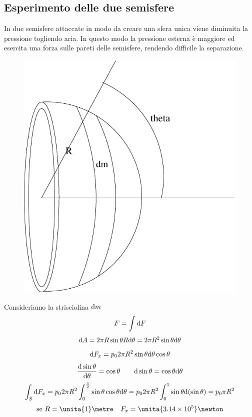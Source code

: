 \subsection{Esperimento delle due semisfere}
In due semisfere attaccate in modo da creare una sfera unica viene diminuita la pressione togliendo aria. In questo modo la pressione esterna è maggiore ed esercita una forza sulle pareti delle semisfere, rendendo difficile la separazione.
\begin{figure}[htbp]
\centering
\includegraphics[scale=0.5]{immagini/fisica1/Sfera_pressione}
\end{figure}

Consideriamo la strisciolina $\mathrm{d} m$
\begin{equation*}F=\int\mathrm{d} F\end{equation*}
\begin{equation*}\mathrm{d} A=2\pi R\sin\theta R\mathrm{d}\theta=2\pi R^2\sin\theta\mathrm{d}\theta\end{equation*}
\begin{equation*}\mathrm{d} F_x=p_0 2\pi R^2\sin\theta\mathrm{d}\theta\cos\theta\end{equation*}
\begin{equation*}\frac{\mathrm{d} \sin\theta}{\mathrm{d} \theta}=\cos\theta\qquad\mathrm{d}\sin\theta=\cos\theta\mathrm{d}\theta\end{equation*}
\begin{equation*}\int_S \mathrm{d} F_x=p_0 2\pi R^2\int_0^{\frac{\pi}{2}}\sin\theta\cos\theta\mathrm{d}\theta=p_0 2\pi R^2\int_0^{1}\sin\theta\mathrm{d}(\sin\theta)=p_0\pi R^2\end{equation*}
\begin{equation*}\text{se } R=\unita{1}\metre\quad F_x=\unita{3.14\times 10^5}\newton\end{equation*}

